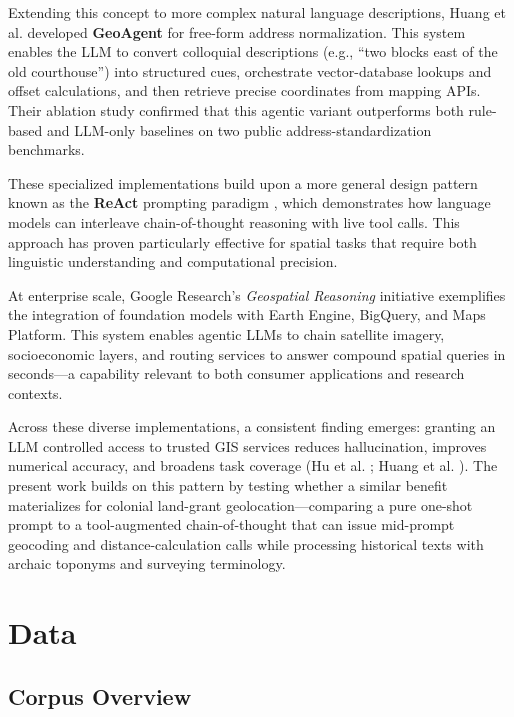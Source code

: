 Extending this concept to more complex natural language descriptions,
Huang et al. \citep{Huang2024_geoagent} developed \textbf{GeoAgent} for
free-form address normalization. This system enables the LLM to convert
colloquial descriptions (e.g., ``two blocks east of the old
courthouse'') into structured cues, orchestrate vector-database lookups
and offset calculations, and then retrieve precise coordinates from
mapping APIs. Their ablation study confirmed that this agentic variant
outperforms both rule-based and LLM-only baselines on two public
address-standardization benchmarks.

These specialized implementations build upon a more general design
pattern known as the \textbf{ReAct} prompting paradigm
\citep{yao2023react}, which demonstrates how language models can
interleave chain-of-thought reasoning with live tool calls. This
approach has proven particularly effective for spatial tasks that
require both linguistic understanding and computational precision.

At enterprise scale, Google Research's \emph{Geospatial Reasoning}
initiative \citep{GoogleResearch2025_geospatial} exemplifies the
integration of foundation models with Earth Engine, BigQuery, and Maps
Platform. This system enables agentic LLMs to chain satellite imagery,
socioeconomic layers, and routing services to answer compound spatial
queries in seconds---a capability relevant to both consumer applications
and research contexts.

Across these diverse implementations, a consistent finding emerges:
granting an LLM controlled access to trusted GIS services reduces
hallucination, improves numerical accuracy, and broadens task coverage
(Hu et al. \citep{Hu2024_toponym_llm}; Huang et al.
\citep{Huang2024_geoagent}). The present work builds on this pattern by
testing whether a similar benefit materializes for colonial land-grant
geolocation---comparing a pure one-shot prompt to a tool-augmented
chain-of-thought that can issue mid-prompt geocoding and
distance-calculation calls while processing historical texts with
archaic toponyms and surveying terminology.

\section{Data}\label{data}

\subsection{Corpus Overview}\label{corpus-overview}

